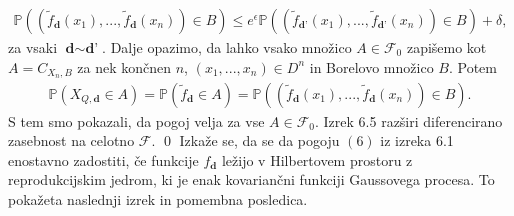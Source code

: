 \documentclass[12pt,a4paper]{amsart}
\theoremstyle{definition} %
\theoremstyle{plain} %
\begin{document}
\begin{gather*}
\mathbb{P}((\tilde{f}_{\textbf{d}}(x_1),...,\tilde{f}_{\textbf{d}}(x_n)) \in B) \leq e^{\epsilon}\mathbb{P}((\tilde{f}_{\textbf{d'}}(x_1),...,\tilde{f}_{\textbf{d'}}(x_n)) \in B) + \delta,
\end{gather*}
za vsaki $\textbf{d} \sim \textbf{d'}$. Dalje opazimo, da lahko vsako množico $A \in \mathcal{F}_0$ zapišemo kot $A = C_{X_n,B}$ za nek končnen $n$, $(x_1,...,x_n) \in D^n$ in Borelovo množico $B$. Potem 
\begin{gather*}
\mathbb{P}(X_{Q,\textbf{d}} \in A) = \mathbb{P}(\tilde{f}_{\textbf{d}}\in A)= \mathbb{P}((\tilde{f}_{\textbf{d}}(x_1),...,\tilde{f}_{\textbf{d}}(x_n)) \in B).
\end{gather*}
S tem smo pokazali, da pogoj velja za vse $A \in \mathcal{F}_0$. Izrek 6.5 razširi diferencirano zasebnost na celotno $\mathcal{F}$.
\qed
\newline
\newline
Izkaže se, da se da pogoju $(6)$ iz izreka 6.1 enostavno zadostiti, če funkcije $f_{\textbf{d}}$ ležijo v Hilbertovem prostoru z reprodukcijskim jedrom, ki je enak kovariančni funkciji Gaussovega procesa. To pokažeta naslednji izrek in pomembna posledica.
\end{document}
